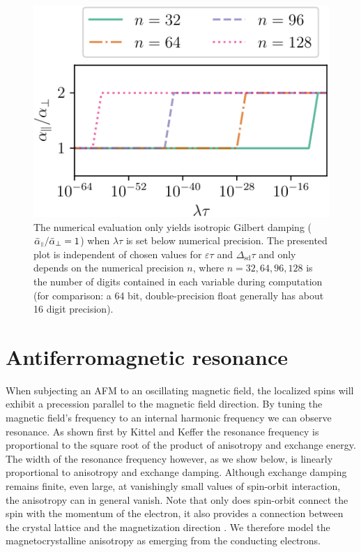 \begin{figure}
    \centering
    \includegraphics[width=0.6\linewidth]{gfx/numerical_test}
    \caption{The numerical evaluation only yields isotropic Gilbert damping ($\bar{\alpha}_{{\scriptscriptstyle\parallel}}/\bar{\alpha}_{\perp}=1$) when $\lambda\tau$ is set below numerical precision. The presented plot is independent of chosen values for $\varepsilon\tau$ and $\Delta_\text{sd}\tau$ and only depends on the numerical precision $n$, where $n=32,64,96,128$ is the number of digits contained in each variable during computation (for comparison: a 64 bit, double-precision float generally has about 16 digit precision). }
    \label{fig:num_test}
\end{figure}

%
%
\section{Antiferromagnetic resonance}
When subjecting an AFM to an oscillating magnetic field, the localized spins will exhibit a precession parallel to the magnetic field direction. By tuning the magnetic field's frequency to an internal harmonic frequency we can observe resonance. As shown first by Kittel and Keffer \cite{PhysRev.82.565, PhysRev.85.329} the resonance frequency is proportional to the square root of the product of anisotropy and exchange energy. The width of the resonance frequency however, as we show below, is linearly proportional to anisotropy and exchange damping. Although exchange damping remains finite, even large, at vanishingly small values of spin-orbit interaction, the anisotropy can in general vanish. Note that only does spin-orbit connect the spin with the momentum of the electron, it also provides a connection between the crystal lattice and the magnetization direction  \cite{hellman_interface-induced_2017, dieny_perpendicular_2017}. We therefore model the magnetocrystalline anisotropy as emerging from the conducting electrons. 

